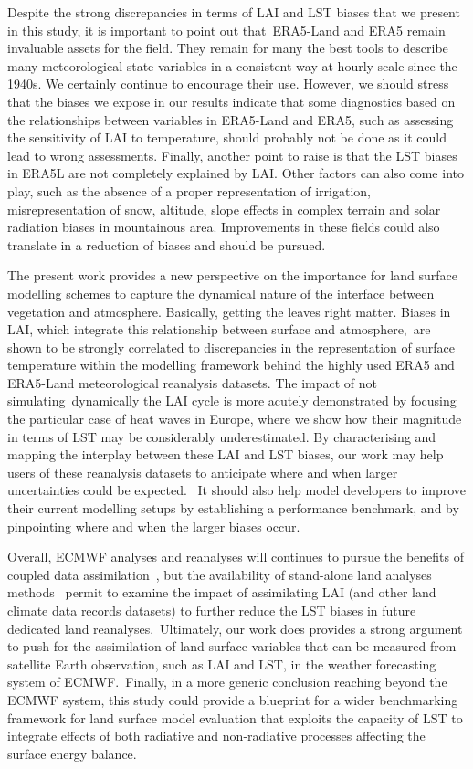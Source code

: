 \documentclass[gmd, manuscript]{copernicus}
\begin{document}
{Despite the strong discrepancies in terms of LAI and LST biases that we
present in this study, it is important to point out that~ERA5-Land and
ERA5 remain invaluable assets for the field. They remain for many the
best tools to describe many meteorological state variables in a
consistent way at hourly scale since the 1940s. We certainly continue to
encourage their use. However, we should stress that the biases we expose
in our results indicate that some diagnostics based on the relationships
between variables in ERA5-Land and ERA5, such as assessing the
sensitivity of LAI to temperature, should probably not be done as it
could lead to wrong assessments. Finally, another point to raise is that 
the LST biases in ERA5L are not completely explained by LAI. Other factors 
can also come into play, such as the absence of a proper representation of 
irrigation, misrepresentation of snow, altitude, slope effects in complex 
terrain and solar radiation biases in mountainous area. Improvements in 
these fields could also translate in a reduction of biases and should be pursued.

\conclusions  %

The present work provides a new perspective on the importance for land
surface modelling schemes to capture the dynamical nature of the
interface between vegetation and atmosphere. Basically, getting the
leaves right matter. Biases in LAI, which integrate this relationship
between surface and atmosphere,~are shown to be strongly correlated to
discrepancies in the representation of surface temperature within the
modelling framework behind the highly used ERA5 and ERA5-Land
meteorological reanalysis datasets. The impact of not
simulating~dynamically the LAI cycle is more acutely demonstrated by
focusing the particular case of heat waves in Europe, where we show how
their magnitude in terms of LST may be considerably underestimated. By
characterising and mapping the interplay between these LAI and LST
biases, our work may help users of these reanalysis datasets to
anticipate where and when larger uncertainties could be expected.~ It
should also help model developers to improve their current modelling
setups by establishing a performance benchmark, and by pinpointing where
and when the larger biases occur.~

Overall, ECMWF analyses and reanalyses will continues to pursue the
benefits of coupled data assimilation~\citep{de_Rosnay_2022}, but the
availability of stand-alone land analyses methods~\citep{Fairbairn_2019}
permit to examine the impact of assimilating LAI (and other land climate
data records datasets) to further reduce the LST biases in future
dedicated land reanalyses.~Ultimately, our work does provides a strong
argument to push for the assimilation of land surface variables that can
be measured from satellite Earth observation, such as LAI and LST, in
the weather forecasting system of ECMWF.~Finally, in a more generic
conclusion reaching beyond the ECMWF system, this study could provide a
blueprint for a wider benchmarking framework for land surface model
evaluation that exploits the capacity of LST to integrate effects of
both radiative and non-radiative processes affecting the surface energy
balance.

}
\end{document}
